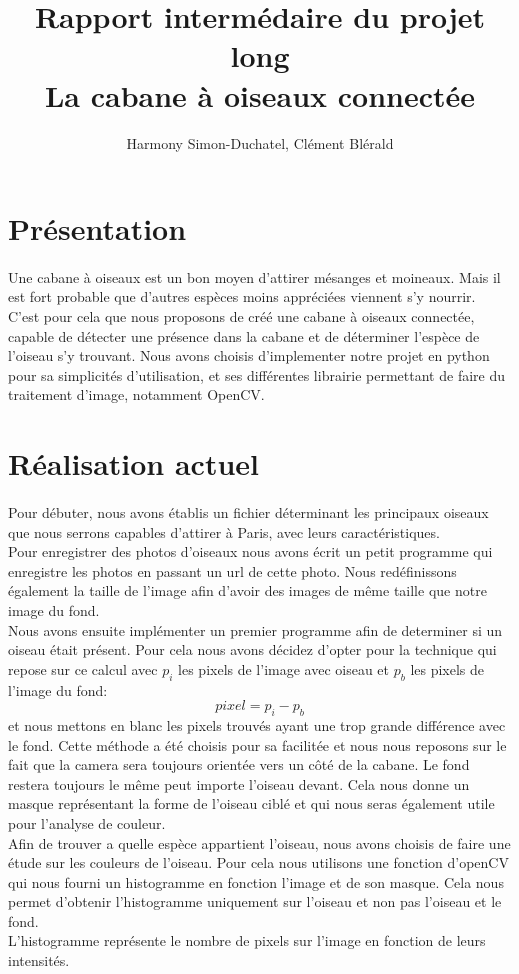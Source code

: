 \documentclass{article}
\title{Rapport intermédaire du projet long \\ La cabane à oiseaux connectée }
\author{Harmony Simon-Duchatel, Clément Blérald}
\begin{document}
\maketitle


\section{Présentation}
\paragraph {}
Une cabane à oiseaux est un bon moyen d'attirer mésanges et moineaux. Mais il est fort probable que d'autres espèces moins appréciées viennent s'y nourrir. \\
C'est pour cela que nous proposons de créé une cabane à oiseaux connectée, capable de détecter une présence dans la cabane et de déterminer l'espèce de l'oiseau s'y trouvant. 
Nous avons choisis d'implementer notre projet en python pour sa simplicités d'utilisation, et ses différentes librairie permettant de faire du traitement d'image, notamment OpenCV.
\section{Réalisation actuel} 
\paragraph {}
Pour débuter, nous avons établis un fichier déterminant les principaux oiseaux que nous serrons capables d'attirer à Paris, avec leurs caractéristiques. \\
Pour enregistrer des photos d'oiseaux nous avons écrit un petit programme qui enregistre les photos en passant un url de cette photo. Nous redéfinissons également la taille de l'image afin d'avoir des images de même taille que notre image du fond.\\
Nous avons ensuite implémenter un premier programme afin de determiner si un oiseau était présent.
Pour cela nous avons décidez d'opter pour la technique qui repose sur ce calcul  avec $p_{i}$ les pixels de l'image avec oiseau et $p_{b}$ les pixels de l'image du fond: 
$$
pixel = p_{i} - p_{b}
$$
et nous mettons en blanc les pixels trouvés ayant une trop grande différence avec le fond. Cette méthode a été choisis pour sa facilitée et nous nous reposons sur le fait que la camera sera toujours orientée vers un côté de la cabane. Le fond restera toujours le même peut importe l'oiseau devant. Cela nous donne un masque représentant la forme de l'oiseau ciblé et qui nous seras également utile pour l'analyse de couleur.\\
Afin de trouver a quelle espèce appartient l'oiseau, nous avons choisis de faire une étude sur les couleurs de l'oiseau. Pour cela nous utilisons une fonction d'openCV qui nous fourni un histogramme en fonction l'image et de son masque. Cela nous permet d'obtenir l'histogramme uniquement sur l'oiseau et non pas l'oiseau et le fond. \\
L'histogramme représente le nombre de pixels sur l'image en fonction de leurs intensités.\\
\end{document}
